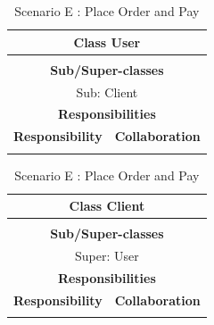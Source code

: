 \documentclass[•]{article}
\begin{document}
\begin{table}
\begin{tabular}{|l||l|}
\hline
\multicolumn{2}{|c|}{ Class \textbf{User} }\\ \hline
\multicolumn{2}{|c|}{}\\ \hline
\multicolumn{2}{|c|}{ \textbf{Sub/Super-classes} }\\ \hline
\multicolumn{2}{|c|}{Sub: Client} \\ \hline
\multicolumn{2}{|c|}{ \textbf{Responsibilities}}\\ \hline
\textbf{Responsibility} & \textbf{Collaboration} \\ \hline
 &  \\ \hline
\end{tabular}
\begin{tabular}{|l||l|}
\hline
\multicolumn{2}{|c|}{ Class \textbf{Client} }\\ \hline
\multicolumn{2}{|c|}{}\\ \hline
\multicolumn{2}{|c|}{ \textbf{Sub/Super-classes} }\\ \hline
\multicolumn{2}{|c|}{Super: User} \\ \hline
\multicolumn{2}{|c|}{ \textbf{Responsibilities}}\\ \hline
\textbf{Responsibility} & \textbf{Collaboration} \\ \hline
 & \\ \hline
\end{tabular}
\caption{Scenario E : Place Order and Pay}
\label{scenarioE}
\end{table}
\end{document}
